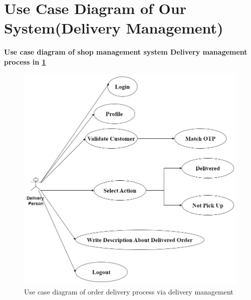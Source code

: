 \section{Use Case Diagram of Our System(Delivery Management)}
\vspace{1cm}
\textbf{Use case diagram of shop management system Delivery management process in \ref{fig:fig4.3}}\\
\begin{figure}[h]
    \centering  
    \includegraphics[width=0.8\linewidth]{update_diagram/use case diagram delivery person.jpg}
    
    \caption{Use case diagram of order delivery process via delivery management}
    \label{fig:fig4.3}
\end{figure}

